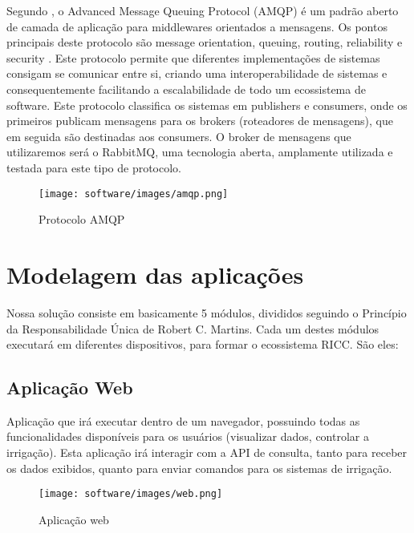     Segundo \cite{ohara_2007}, o Advanced Message Queuing Protocol (AMQP) é um padrão aberto de camada de aplicação para middlewares orientados a mensagens. Os pontos principais deste protocolo são message orientation, queuing, routing, reliability e security .
    Este protocolo permite que diferentes implementações de sistemas consigam se comunicar entre si, criando uma interoperabilidade de sistemas e consequentemente facilitando a escalabilidade de todo um ecossistema de software.
    Este protocolo classifica os sistemas em publishers e consumers, onde os primeiros publicam mensagens para os brokers (roteadores de mensagens), que em seguida são destinadas aos consumers.
    O broker de mensagens que utilizaremos será o RabbitMQ, uma tecnologia aberta, amplamente utilizada e testada para este tipo de protocolo.
    
    \begin{figure}[H]
        \centering
        \texttt{[image: software/images/amqp.png]}
        \caption{Protocolo AMQP}
        \label{fig:amqp}
    \end{figure}

    \section{Modelagem das aplicações}
    
    Nossa solução consiste em basicamente 5 módulos, divididos seguindo  o Princípio da Responsabilidade Única de Robert C. Martins. Cada um destes módulos executará em diferentes dispositivos, para formar o  ecossistema RICC. São eles:
    
    \subsection{Aplicação Web}

    Aplicação que irá executar dentro de um navegador, possuindo todas as funcionalidades disponíveis para os usuários (visualizar dados, controlar a irrigação).
	Esta aplicação irá interagir com a API de consulta, tanto para receber os dados exibidos, quanto para enviar comandos para os sistemas de irrigação.

    \begin{figure}[H]
    	
    	\centering
        \texttt{[image: software/images/web.png]}
        \caption{Aplicação web}
        \label{fig:web}
    \end{figure}


